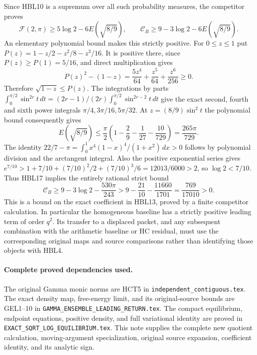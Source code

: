 Since HBL10 is a supremum over all such probability measures,
the competitor proves
\[
 \mathcal F(2,\pi)\ge5\log2-6E(\sqrt{8/9}),\qquad
 \mathcal C_B\ge9-3\log2-6E(\sqrt{8/9}).
 \tag{HBL17}
\]
An elementary polynomial bound makes this strictly positive. For
$0\le z\le1$ put $P(z)=1-z/2-z^2/8-z^3/16$. It is positive there,
since $P(z)\ge P(1)=5/16$, and direct multiplication gives
\[
 P(z)^2-(1-z)=\frac{5z^4}{64}+\frac{z^5}{64}+\frac{z^6}{256}\ge0.
\]
Therefore $\sqrt{1-z}\le P(z)$. The integrations by parts
$\int_0^{\pi/2}\sin^{2r}t\,dt=
 (2r-1)/(2r)\int_0^{\pi/2}\sin^{2r-2}t\,dt$ give the exact
second, fourth and sixth power integrals $\pi/4,3\pi/16,5\pi/32$.
At $z=(8/9)\sin^2t$ the polynomial bound consequently gives
\[
 E(\sqrt{8/9})\le\frac\pi2
 \left(1-\frac29-\frac1{27}-\frac{10}{729}\right)
 =\frac{265\pi}{729}.
\]
The identity
$22/7-\pi=\int_0^1x^4(1-x)^4/(1+x^2)\,dx>0$
follows by polynomial division and the arctangent integral.
Also the positive exponential series gives
$e^{7/10}>1+7/10+(7/10)^2/2+(7/10)^3/6=12013/6000>2$,
so $\log2<7/10$. Thus HBL17 implies the entirely rational strict bound
\[
 \boxed{\mathcal C_B\ge9-3\log2-\frac{530\pi}{243}
       >9-\frac{21}{10}-\frac{11660}{1701}
       =\frac{769}{17010}>0.}
 \tag{HBL18}
\]
This is a bound on the exact coefficient in HBL13, proved by a finite
competitor calculation. In particular the homogeneous baseline has a
strictly positive leading term of order $q^2$. Its transfer to a
displaced packet, and any subsequent combination with the arithmetic
baseline or HC residual, must use the corresponding original maps and
source comparisons rather than identifying those objects with HBL4.

\paragraph{Complete proved dependencies used.}
The original Gamma monic norms are HCT5 in
\texttt{independent\_contiguous.tex}. The exact density map, free-energy
limit, and its original-source bounds are GEL1--10 in
\texttt{GAMMA\_ENSEMBLE\_LEADING\_RETURN.tex}. The compact equilibrium,
endpoint equations, positive density, and full variational identity are
proved in \texttt{EXACT\_SQRT\_LOG\_EQUILIBRIUM.tex}. This note supplies
the complete new quotient calculation, moving-argument specialization,
original source expansion, coefficient identity, and its analytic sign.

